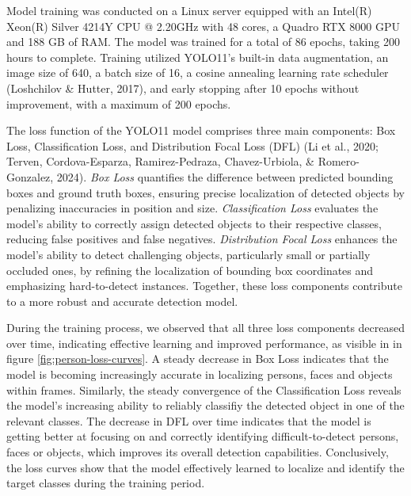 \documentclass[
  man,floatsintext]{apa6}
\begin{document}
Model training was conducted on a Linux server equipped with an Intel(R) Xeon(R) Silver 4214Y CPU @ 2.20GHz with 48 cores, a Quadro RTX 8000 GPU and 188 GB of RAM. The model was trained for a total of 86 epochs, taking 200 hours to complete. Training utilized YOLO11's built-in data augmentation, an image size of 640, a batch size of 16, a cosine annealing learning rate scheduler (Loshchilov \& Hutter, 2017), and early stopping after 10 epochs without improvement, with a maximum of 200 epochs.

The loss function of the YOLO11 model comprises three main components: Box Loss, Classification Loss, and Distribution Focal Loss (DFL) (Li et al., 2020; Terven, Cordova-Esparza, Ramirez-Pedraza, Chavez-Urbiola, \& Romero-Gonzalez, 2024). \emph{Box Loss} quantifies the difference between predicted bounding boxes and ground truth boxes, ensuring precise localization of detected objects by penalizing inaccuracies in position and size. \emph{Classification Loss} evaluates the model's ability to correctly assign detected objects to their respective classes, reducing false positives and false negatives. \emph{Distribution Focal Loss} enhances the model's ability to detect challenging objects, particularly small or partially occluded ones, by refining the localization of bounding box coordinates and emphasizing hard-to-detect instances. Together, these loss components contribute to a more robust and accurate detection model.

During the training process, we observed that all three loss components decreased over time, indicating effective learning and improved performance, as visible in in figure \ref{fig:person-loss-curves}. A steady decrease in Box Loss indicates that the model is becoming increasingly accurate in localizing persons, faces and objects within frames. Similarly, the steady convergence of the Classification Loss reveals the model's increasing ability to reliably classifiy the detected object in one of the relevant classes. The decrease in DFL over time indicates that the model is getting better at focusing on and correctly identifying difficult-to-detect persons, faces or objects, which improves its overall detection capabilities. Conclusively, the loss curves show that the model effectively learned to localize and identify the target classes during the training period.
\end{document}
